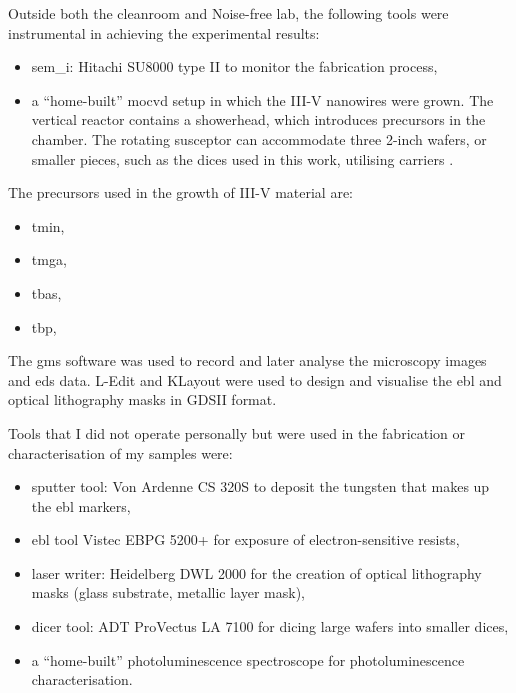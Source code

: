 Outside both the cleanroom and Noise-free lab, the following tools were instrumental in achieving the experimental results:
\begin{itemize}
    \item \acf{sem_i}: Hitachi SU8000 type II to monitor the fabrication process,
    \item a “home-built” \acf{mocvd} setup in which the III-V nanowires were grown. The vertical reactor contains a showerhead, which introduces precursors in the chamber. The rotating susceptor can accommodate three 2-inch wafers, or smaller pieces, such as the  dices used in this work, utilising carriers \cite{Brugnolotto2023}.
\end{itemize}
\par
The precursors used in the growth of III-V material are:
\begin{itemize}
    \item \acf{tmin},
    \item \acf{tmga},
    \item \acf{tbas},
    \item \acf{tbp},
\end{itemize}

The \acf{gms} software was used to record and later analyse the microscopy images and \acs{eds} data. L-Edit and KLayout were used to design and visualise the \acf{ebl} and optical lithography masks in GDSII format. 
\par 
Tools that I did not operate personally but were used in the fabrication or characterisation of my samples were:
\begin{itemize}
    \item sputter tool: Von Ardenne CS 320S to deposit the tungsten that makes up the \acl{ebl} markers,
    \item \acl{ebl} tool Vistec EBPG 5200+ for exposure of electron-sensitive resists,
    \item laser writer: Heidelberg DWL 2000 for the creation of optical lithography masks (glass substrate, metallic layer mask),
    \item dicer tool: ADT ProVectus LA 7100 for dicing large wafers into smaller dices,
    \item a “home-built” photoluminescence spectroscope for photoluminescence characterisation.
\end{itemize}